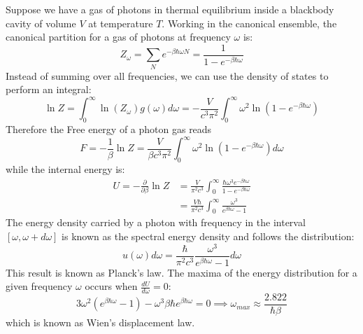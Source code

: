 \documentclass[a4paper,11pt,oneside]{book}
\begin{document}
Suppose we have a gas of photons in thermal equilibrium inside a blackbody cavity of volume $V$ at temperature $T$. Working in the canonical ensemble, the canonical partition for a gas of photons at frequency $\omega$ is:
\begin{equation}
    Z_\omega = \sum_N e^{-\beta \hbar \omega N} = \frac{1}{1-e^{-\beta \hbar \omega}} 
\end{equation}
Instead of summing over all frequencies, we can use the density of states to perform an integral:
\begin{equation}
    \ln Z = \int_0^\infty \ln (Z_\omega) g(\omega)  d\omega  = -\frac{V}{c^3 \pi^2} \int_0^\infty {\omega^2} \ln(1-e^{-\beta \hbar \omega})
\end{equation}
Therefore the Free energy of a photon gas reads
\begin{equation}\label{free energy light}
    F=-\frac{1}{\beta}\ln Z = \frac{V}{\beta c^3 \pi^2} \int_0^\infty \omega^2 \ln(1-e^{-\beta \hbar \omega}) d\omega
\end{equation}
while the internal energy is:
\begin{align}\label{energy light}
    U = -\frac{\partial}{\partial \beta} \ln Z &= \frac{V}{\pi^2 c^3}  \int_0^\infty \frac{\hbar \omega^3 e^{-\beta \hbar \omega}}{1-e^{-\beta \hbar \omega}}\\
    &=\frac{V \hbar}{\pi^2 c^3}\int_0^\infty  \frac{\omega^3}{e^{\beta \hbar \omega}-1}
\end{align}
The energy density carried by a photon with frequency in the interval $[\omega,\omega+d\omega]$ is known as the spectral energy density and follows the distribution:
\begin{equation}\label{planck law}
    \boxed{u(\omega) d\omega = \frac{\hbar}{\pi^2c^3}  \frac{\omega^3}{e^{\beta \hbar \omega}-1}d\omega}
\end{equation}
This result is known as Planck's law. The maxima of the energy distribution for a given frequency $\omega$ occurs when $\frac{dU}{d\omega} = 0$:
\begin{equation}
   3\omega^2(e^{\beta \hbar \omega}-1) - \omega^3 \beta \hbar e^{\beta \hbar \omega} = 0 \implies  \boxed{\omega_{max} \approx \frac{2.822}{\hbar \beta}}
\end{equation}
which is known as Wien's displacement law. 
\end{document}
